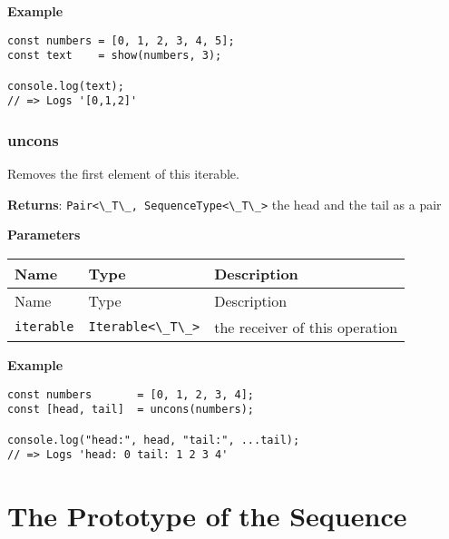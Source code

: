 \textbf{Example}

\begin{lstlisting}[label=7e589eab-b8b6-4efa-8f88-a1f246754972]
const numbers = [0, 1, 2, 3, 4, 5];
const text    = show(numbers, 3);
                                   
console.log(text);
// => Logs '[0,1,2]'
\end{lstlisting}

\hypertarget{235974db-05c7-4513-8478-7d9ca31e50b4}{%
\subsubsection{uncons}\label{235974db-05c7-4513-8478-7d9ca31e50b4}}

Removes the first element of this iterable.

\textbf{Returns}:
\passthrough{\lstinline!Pair<\_T\_, SequenceType<\_T\_>!} the head and
the tail as a pair

\textbf{Parameters}

\begin{longtable}[]{
  >{\raggedright\arraybackslash}p{}
  >{\raggedright\arraybackslash}p{}
  >{\raggedright\arraybackslash}p{}@{}}

\toprule\noalign{}
Name & Type & Description \\
\midrule\noalign{}
\endfirsthead
\toprule\noalign{}
Name & Type & Description \\
\midrule\noalign{}
\endhead
\bottomrule\noalign{}
\endlastfoot
\passthrough{\lstinline!iterable!} &
\passthrough{\lstinline!Iterable<\_T\_>!} & the receiver of this
operation \\
\end{longtable}

\textbf{Example}

\begin{lstlisting}[label=7a7b4acd-51a2-4d02-ba76-76bc89af2bfc]
const numbers       = [0, 1, 2, 3, 4];
const [head, tail]  = uncons(numbers);
                                             
console.log("head:", head, "tail:", ...tail);
// => Logs 'head: 0 tail: 1 2 3 4'
\end{lstlisting}

\hypertarget{7ab5394b-94c8-49fd-b747-3fafa3764d32}{%
\section{The Prototype of the
Sequence}\label{7ab5394b-94c8-49fd-b747-3fafa3764d32}}

